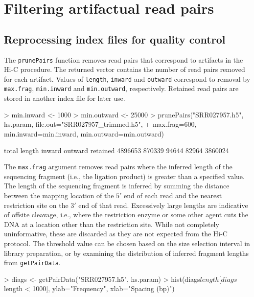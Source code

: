 \documentclass[12pt]{report}
\renewenvironment{Schunk}{\vspace{0pt}}{\vspace{0pt}}
\newcommand{\code}[1]{{\small\texttt{#1}}}
\begin{document}
\section{Filtering artifactual read pairs}

\subsection{Reprocessing index files for quality control}
The \code{prunePairs} function removes read pairs that correspond to artifacts in the Hi-C procedure.
The returned vector contains the number of read pairs removed for each artifact.
Values of \code{length}, \code{inward} and \code{outward} correspond to removal by \code{max.frag}, \code{min.inward} and \code{min.outward}, respectively.
Retained read pairs are stored in another index file for later use.

\begin{Schunk}
\begin{Sinput}
> min.inward <- 1000
> min.outward <- 25000
> prunePairs("SRR027957.h5", hs.param, file.out="SRR027957_trimmed.h5", 
+     max.frag=600, min.inward=min.inward, min.outward=min.outward)
\end{Sinput}
\begin{Soutput}
   total   length   inward  outward retained 
 4896653   870339    94644    82964  3860024 
\end{Soutput}
\end{Schunk}

The \code{max.frag} argument removes read pairs where the inferred length of the sequencing fragment (i.e., the ligation product) is greater than a specified value.
The length of the sequencing fragment is inferred by summing the distance between the mapping location of the $5'$ end of each read and the nearest restriction site on the $3'$ end of that read.
Excessively large lengths are indicative of offsite cleavage, i.e., where the restriction enzyme or some other agent cuts the DNA at a location other than the restriction site.
While not completely uninformative, these are discarded as they are not expected from the Hi-C protocol.
The threshold value can be chosen based on the size selection interval in library preparation, or by examining the distribution of inferred fragment lengths from \code{getPairData}.

\begin{Schunk}
\begin{Sinput}
> diags <- getPairData("SRR027957.h5", hs.param)
> hist(diags$length[diags$length < 1000], ylab="Frequency", xlab="Spacing (bp)")
\end{Sinput}
\end{Schunk}
\end{document}

